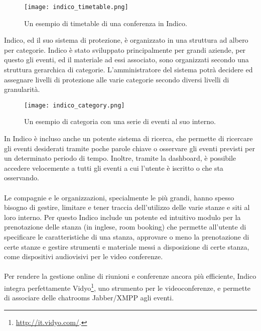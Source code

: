 		\begin{figure}[h!]
			\begin{center}
				\texttt{[image: indico\_timetable.png]}
			\end{center}
			\caption[Timetable in Indico (esempio)]{Un esempio di timetable di una conferenza in Indico.}
			\label{fig:indico_timetable}
		\end{figure}
		\noindent
		Indico, ed il suo sistema di protezione, è organizzato in una struttura ad albero per categorie. Indico è stato sviluppato principalmente per grandi aziende, per questo gli eventi, ed il materiale ad essi associato, sono organizzati secondo una struttura gerarchica di categorie. L'amministratore del sistema potrà decidere ed assegnare livelli di protezione alle varie categorie secondo diversi livelli di granularità.\\

		\begin{figure}[h!]
			\begin{center}
				\texttt{[image: indico\_category.png]}
			\end{center}
			\caption[Categoria in Indico (esempio)]{Un esempio di categoria con una serie di eventi al suo interno.}
			\label{fig:indico_category}
		\end{figure}
		\noindent
		In Indico è incluso anche un potente sistema di ricerca, che permette di ricercare gli eventi desiderati tramite poche parole chiave o osservare gli eventi previsti per un determinato periodo di tempo. Inoltre, tramite la dashboard, è possibile accedere velocemente a tutti gli eventi a cui l'utente è iscritto o che sta osservando.\\
		\\
		Le compagnie e le organizzazioni, specialmente le più grandi, hanno spesso bisogno di gestire, limitare e tener traccia dell'utilizzo delle varie stanze e siti al loro interno. Per questo Indico include un potente ed intuitivo modulo per la prenotazione delle stanza (in inglese, room booking) che permette all'utente di specificare le caratteristiche di una stanza, approvare o meno la prenotazione di certe stanze e gestire strumenti e materiale messi a disposizione di certe stanza, come dispositivi audiovisivi per le video conferenze.\\
		\\
		Per rendere la gestione online di riunioni e conferenze ancora più efficiente, Indico integra perfettamente Vidyo\footnote{\url{http://it.vidyo.com/}.}, uno strumento per le videoconferenze, e permette di associare delle chatrooms Jabber/XMPP agli eventi.\\

